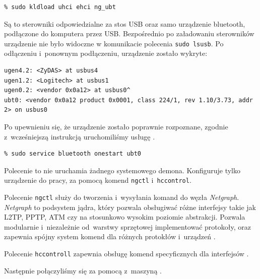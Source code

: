 \begin{lstlisting}
% sudo kldload uhci ehci ng_ubt
\end{lstlisting}

Są to sterowniki odpowiedzialne za stos USB oraz samo urządzenie bluetooth,
podłączone do komputera przez USB. Bezpośrednio po załadowaniu sterowników
urządzenie nie było widoczne w komunikacie polecenia \texttt{sudo lsusb}. Po
odłączeniu i~ponownym podłączeniu, urządzenie zostało wykryte:

\begin{lstlisting}[caption={Potwierdzenie w logu systemowym, że urządzenie \bt{} zostało wykryte.}]
% dmesg | tail
ugen4.2: <ZyDAS> at usbus4
ugen1.2: <Logitech> at usbus1
ugen0.2: <vendor 0x0a12> at usbus0^
ubt0: <vendor 0x0a12 product 0x0001, class 224/1, rev 1.10/3.73, addr 2> on usbus0
\end{lstlisting}

Po upewnieniu się, że urządzenie zostało poprawnie rozpoznane, zgodnie
z~wcześniejszą instrukcją uruchomiliśmy usługę \bt.

\begin{lstlisting}
% sudo service bluetooth onestart ubt0
\end{lstlisting}

Polecenie to nie uruchamia żadnego systemowego demona. Konfiguruje tylko
urządzenie \bt do pracy, za pomocą komend \texttt{ngctl} i~\texttt{hccontrol}.

Polecenie \texttt{ngctl} służy do tworzenia i~wysyłania komand do węzła
\emph{Netgraph}. \emph{Netgraph} to podsystem jądra, który pozwala obsługiwać
różne interfejsy takie jak L2TP, PPTP, ATM czy \bt{} na stosunkowo wysokim
poziomie abstrakcji. Pozwala modularnie i~niezależnie od~warstwy sprzętowej
implementować protokoły, oraz zapewnia spójny system komend dla różnych
protokłów i~urządzeń \cite{man:netgraph}.

Polecenie \texttt{hccontroll} zapewnia obsługę komend specyficznych dla
interfejsów \bt.

Następnie połączyliśmy się za pomocą \bt{} z~maszyną \kosiem.

